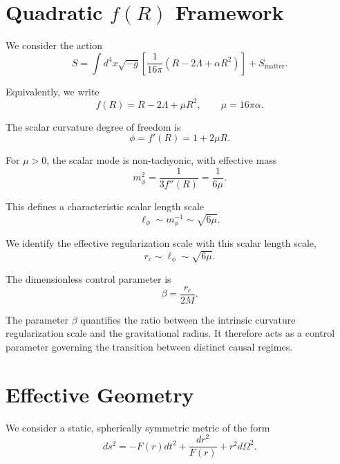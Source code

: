 \documentclass[11pt,a4paper]{article}
\begin{document}
\section{Quadratic $f(R)$ Framework}

We consider the action
\begin{equation}
S =
\int d^4x \sqrt{-g}
\left[
\frac{1}{16\pi}
\left(
R - 2\Lambda + \alpha R^2
\right)
\right]
+ S_{\mathrm{matter}} .
\end{equation}

Equivalently, we write
\begin{equation}
f(R) = R - 2\Lambda + \mu R^2,
\qquad
\mu = 16\pi\alpha .
\end{equation}

The scalar curvature degree of freedom is
\begin{equation}
\phi = f'(R) = 1 + 2\mu R .
\end{equation}

For $\mu>0$, the scalar mode is non-tachyonic, with effective mass
\begin{equation}
m_\phi^2 = \frac{1}{3f''(R)} = \frac{1}{6\mu}.
\end{equation}

This defines a characteristic scalar length scale
\begin{equation}
\ell_\phi \sim m_\phi^{-1} \sim \sqrt{6\mu}.
\end{equation}

We identify the effective regularization scale with this scalar length scale,
\begin{equation}
r_c \sim \ell_\phi \sim \sqrt{6\mu}.
\end{equation}

The dimensionless control parameter is
\begin{equation}
\beta = \frac{r_c}{2M}.
\end{equation}

The parameter $\beta$ quantifies the ratio between the intrinsic curvature regularization scale and the gravitational radius. It therefore acts as a control parameter governing the transition between distinct causal regimes.

\section{Effective Geometry}

We consider a static, spherically symmetric metric of the form
\begin{equation}
ds^2 =
-F(r)dt^2
+
\frac{dr^2}{F(r)}
+
r^2 d\Omega^2 .
\end{equation}
\end{document}
